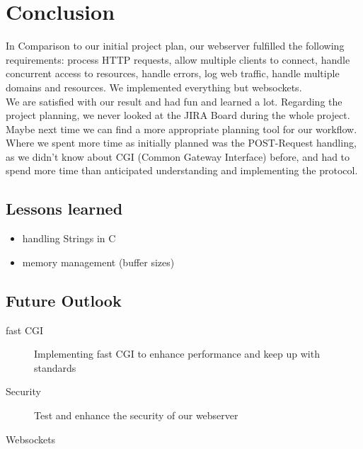 \section*{Conclusion}
In Comparison to our initial project plan, our webserver fulfilled the following requirements: process HTTP requests, allow multiple clients to connect, handle concurrent access to resources, handle errors, log web traffic, handle multiple domains and resources. We implemented everything but websockets. \\

We are satisfied with our result and had fun and learned a lot. Regarding the project planning, we never looked at the JIRA Board during the whole project. Maybe next time we can find a more appropriate planning tool for our workflow. \\

Where we spent more time as initially planned was the POST-Request handling, as we didn't know about CGI (Common Gateway Interface) before, and had to spend more time than anticipated understanding and implementing the protocol. 

\subsection*{Lessons learned}
\begin{itemize}
    \item handling Strings in C 
    \item memory management (buffer sizes)
\end{itemize}

\subsection*{Future Outlook}
\begin{description}
    \item[fast CGI]Implementing fast CGI to enhance performance and keep up with standards
    \item[Security]Test and enhance the security of our webserver
    \item[Websockets]
\end{description}
